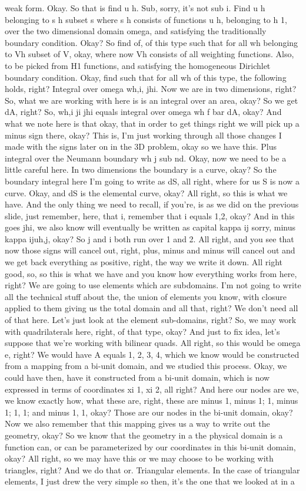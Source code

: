 \documentclass[10pt]{article}
\begin{document}
weak form. Okay. So that is find u h. Sub, sorry, it's not sub i. Find u h belonging to s h subset s where s h consists of functions u h, belonging to h 1, over the two dimensional domain omega, and satisfying the traditionally boundary condition. Okay? So find of, of this type such that for all wh belonging to Vh subset of V, okay, where now Vh consists of all weighting functions. Also, to be picked from H1 functions, and satisfying the homogeneous Dirichlet boundary condition. Okay, find such that for all wh of this type, the following holds, right? Integral over omega wh,i, jhi. Now we are in two dimensions, right? So, what we are working with here is is an integral over an area, okay? So we get dA, right? So, wh,i ji jhi equals integral over omega wh f bar dA, okay? And what we note here is that okay, that in order to get things right we will pick up a minus sign there, okay? This is, I'm just working through all those changes I made with the signs later on in the 3D problem, okay so we have this. Plus integral over the Neumann boundary wh j sub nd. Okay, now we need to be a little careful here. In two dimensions the boundary is a curve, okay? So the boundary integral here I'm going to write as dS, all right, where for us S is now a curve. Okay, and dS is the elemental curve, okay? All right, so this is what we have. And the only thing we need to recall, if you're, is as we did on the previous slide, just remember, here, that i, remember that i equals 1,2, okay? And in this goes jhi, we also know will eventually be written as capital kappa ij sorry, minus kappa ijuh,j, okay? So j and i both run over 1 and 2. All right, and you see that now those signs will cancel out, right, plus, minus and minus will cancel out and we get back everything as positive, right, the way we write it down. All right good, so, so this is what we have and you know how everything works from here, right? We are going to use elements which are subdomains. I'm not going to write all the technical stuff about the, the union of elements you know, with closure applied to them giving us the total domain and all that, right? We don't need all of that here. Let's just look at the element sub-domains, right? So, we may work with quadrilaterals here, right, of that type, okay? And just to fix idea, let's suppose that we're working with bilinear quads. All right, so this would be omega e, right? We would have A equals 1, 2, 3, 4, which we know would be constructed from a mapping from a bi-unit domain, and we studied this process. Okay, we could have then, have it constructed from a bi-unit domain, which is now expressed in terms of coordinates xi 1, xi 2, all right? And here our nodes are we, we know exactly how, what these are, right, these are minus 1, minus 1; 1, minus 1; 1, 1; and minus 1, 1, okay? Those are our nodes in the bi-unit domain, okay? Now we also remember that this mapping gives us a way to write out the geometry, okay? So we know that the geometry in a the physical domain is a function can, or can be parameterized by our coordinates in this bi-unit domain, okay? All right, so we may have this or we may choose to be working with triangles, right? And we do that or. Triangular elements. In the case of triangular elements, I just drew the very simple so then, it's the one that we looked at in a 
\end{document}
